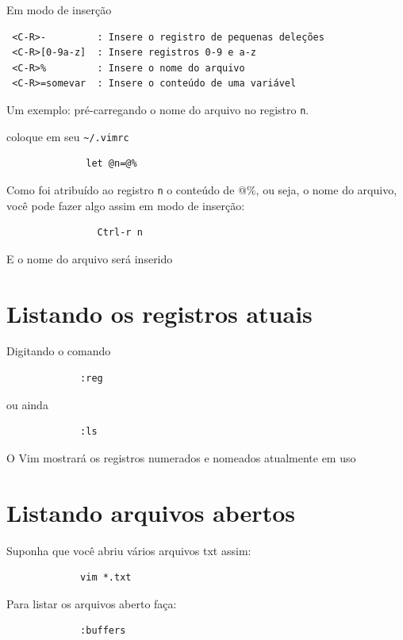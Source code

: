 \documentclass[10pt,a4paper,openany]{book}
\begin{document}
Em modo de inserção

\begin{verbatim}
 <C-R>-         : Insere o registro de pequenas deleções
 <C-R>[0-9a-z]  : Insere registros 0-9 e a-z
 <C-R>%         : Insere o nome do arquivo
 <C-R>=somevar  : Insere o conteúdo de uma variável
\end{verbatim}


Um exemplo: pré-carregando o nome do arquivo no registro \verb+n+.

coloque em seu \verb+~/.vimrc+

\begin{verbatim}
			  let @n=@%
\end{verbatim}

Como foi atribuído ao registro \verb+n+ o conteúdo de @\%, ou seja, o nome
do arquivo, você pode fazer algo assim em modo de inserção:

\begin{verbatim}
				Ctrl-r n
\end{verbatim}

E o nome do arquivo será inserido

\section{Listando os registros atuais}
\label{Listando os registros atuais}
Digitando o comando

\begin{verbatim}
			 :reg
\end{verbatim}

ou ainda

\begin{verbatim}
			 :ls
\end{verbatim}

O Vim mostrará os registros numerados e nomeados atualmente em uso

\section{Listando arquivos abertos}
\label{Listando arquivos abertos}
Suponha que você abriu vários arquivos txt assim:

\begin{verbatim}
			 vim *.txt
\end{verbatim}

Para listar os arquivos aberto faça:

\begin{verbatim}
			 :buffers
\end{verbatim}
\end{document}
